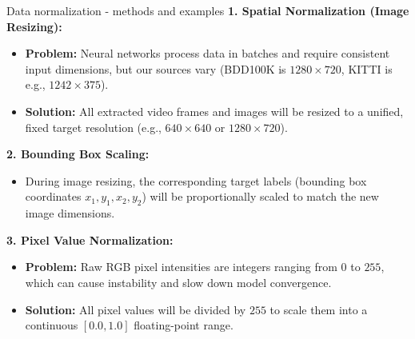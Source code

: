\documentclass{beamer}
\begin{document}
\begin{frame}{Data normalization - methods and examples}
    \textbf{1. Spatial Normalization (Image Resizing):}
    \begin{itemize}
        \item \textbf{Problem:} Neural networks process data in batches and require consistent input dimensions, but our sources vary (BDD100K is $1280 \times 720$, KITTI is e.g., $1242 \times 375$).
        \item \textbf{Solution:} All extracted video frames and images will be resized to a unified, fixed target resolution (e.g., $640 \times 640$ or $1280 \times 720$).
    \end{itemize}

    \vspace{0.3cm}
    \textbf{2. Bounding Box Scaling:}
    \begin{itemize}
        \item During image resizing, the corresponding target labels (bounding box coordinates $x_1, y_1, x_2, y_2$) will be proportionally scaled to match the new image dimensions.
    \end{itemize}

    \vspace{0.3cm}
    \textbf{3. Pixel Value Normalization:}
    \begin{itemize}
        \item \textbf{Problem:} Raw RGB pixel intensities are integers ranging from $0$ to $255$, which can cause instability and slow down model convergence.
        \item \textbf{Solution:} All pixel values will be divided by $255$ to scale them into a continuous $[0.0, 1.0]$ floating-point range.
    \end{itemize}
\end{frame}
\end{document}
